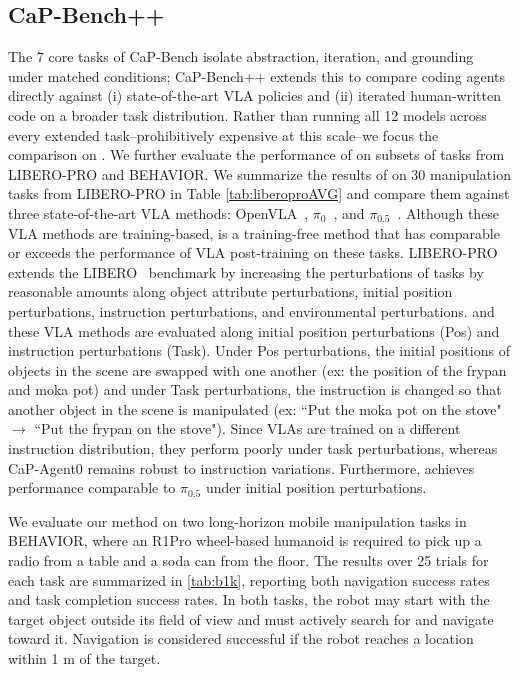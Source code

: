 \subsection{CaP-Bench++}
The 7 core tasks of CaP-Bench isolate abstraction, iteration, and grounding under matched conditions; CaP-Bench++ extends this to compare coding agents directly against (i) state-of-the-art VLA policies and (ii) iterated human-written code on a broader task distribution. Rather than running all 12 models across every extended task--prohibitively expensive at this scale--we focus the comparison on \sysname{}.
We further evaluate the performance of \sysname{} on subsets of tasks from LIBERO-PRO and BEHAVIOR. We summarize the results of \sysname{}  on 30 manipulation tasks from  LIBERO-PRO in Table \ref{tab:liberoproAVG} and compare them against three state-of-the-art VLA methods: OpenVLA~\cite{kim2024openvlaopensourcevisionlanguageactionmodel}, $\pi_0$~\cite{black2024pi0visionlanguageactionflowmodel}, and $\pi_{0.5}$~\cite{intelligence2025pi05}. Although these VLA methods are training-based, \sysname{} is a training-free method that has comparable or exceeds the performance of VLA post-training on these tasks. LIBERO-PRO~\cite{zhou2025liberopro} extends the LIBERO~\cite{liu2023libero} benchmark by increasing the perturbations of tasks by reasonable amounts along object attribute perturbations, initial position perturbations, instruction perturbations, and environmental perturbations. \sysname{} and these VLA methods are evaluated along initial position perturbations (Pos) and instruction perturbations (Task). Under Pos perturbations, the initial positions of objects in the scene are swapped with one another (ex: the position of the frypan and moka pot) and under Task perturbations, the instruction is changed so that another object in the scene is manipulated (ex: ``Put the moka pot on the stove" $\rightarrow$ ``Put the frypan on the stove"). Since VLAs are trained on a different instruction distribution, they perform poorly under task perturbations, whereas CaP-Agent0 remains robust to instruction variations. Furthermore, \sysname{} achieves performance comparable to $\pi_{0.5}$ under initial position perturbations.

We evaluate our method on two long-horizon mobile manipulation tasks in BEHAVIOR, where an R1Pro wheel-based humanoid is required to pick up a radio from a table and a soda can from the floor. The results over 25 trials for each task are summarized in \cref{tab:b1k}, reporting both navigation success rates and task completion success rates. In both tasks, the robot may start with the target object outside its field of view and must actively search for and navigate toward it. Navigation is considered successful if the robot reaches a location within 1 m of the target.

